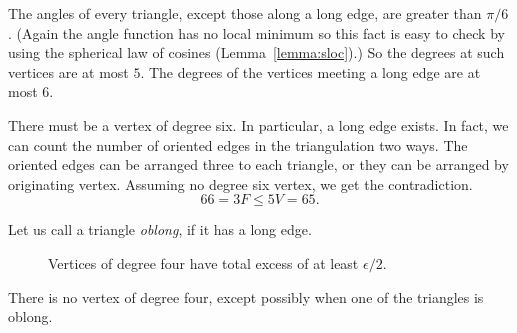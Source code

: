The angles of every triangle, except those along a long edge, are
greater than $\pi/6$. (Again the angle function has no local
minimum so this fact is easy to check by using the spherical law of cosines (Lemma~\ref{lemma:sloc}).) So
the degrees at such vertices are at most $5$.  The degrees of the
vertices meeting a long edge are at most $6$.



There must be a vertex of degree six.  In particular, a long edge
exists.  In fact, we can count the number of oriented edges in the
triangulation two ways.  The oriented edges can be arranged three
to each triangle, or they can be arranged by originating vertex.
Assuming no degree six vertex, we get the contradiction.
    $$66 = 3 F \le 5 V = 65.$$

Let us call a triangle {\it oblong}, if it has a long edge.

\begin{figure}[htb]
  \centering
  \caption{Vertices of degree four have total
excess of at least $\epsilon/2$.}
  \label{fig:13:C}
\end{figure}

\begin{lemma}  There is no vertex of degree four, except possibly
when one of the triangles is oblong.
\end{lemma}

